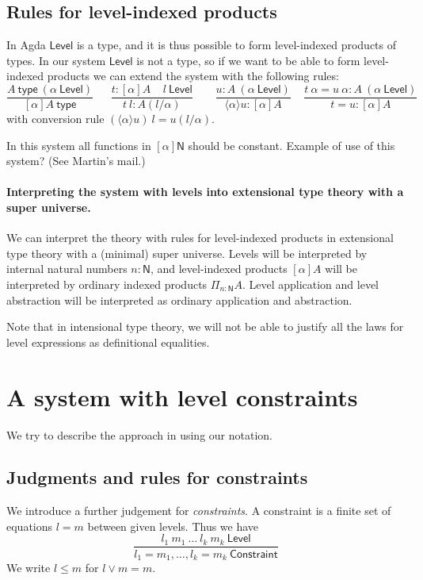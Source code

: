 \documentclass[11pt,a4paper]{article}
\newcommand{\lam}[2]{{\langle}#1{\rangle}#2}
\def\NN{\mathsf{N}}
\def\Level{\mathsf{Level}}
\newcommand{\type}{\mathsf{type}}
\def\Constraint{\mathsf{Constraint}}
\begin{document}
\subsection*{Rules for level-indexed products}

In Agda $\Level$ is a type, and it is thus possible to form level-indexed products of types. In our system $\Level$ is not a type, so if we want to be able to form level-indexed products we can extend the system with the following rules:
$$
\frac{A~\type~(\alpha~\Level)}{[\alpha]A~\type}~~~~~~~
\frac{t:[\alpha]A~~~~~l~\Level}
     {t~l:A(l/\alpha)}~~~~~~~~~
\frac{u:A~(\alpha~\Level)}{\lam{\alpha}{u}: [\alpha]A}~~~~~
\frac{t~\alpha = u~\alpha:A~(\alpha~\Level)}{t = u:[\alpha]A}
$$
with conversion rule $(\lam{\alpha}{u})~l = u(l/\alpha)$.

In this system all functions in $[\alpha]\NN$
should be constant. Example of use of this system? (See Martin's mail.)

\paragraph{Interpreting the system with levels into extensional type theory with a super universe.} We can interpret the theory with rules for level-indexed products in extensional type theory with a (minimal) super universe. Levels will be interpreted by internal natural numbers $n : \NN$, and level-indexed products $[\alpha]A$ will be interpreted by ordinary indexed products $\Pi_{n : \NN}A$. Level application and level abstraction will be interpreted as ordinary application and abstraction.

Note that in intensional type theory, we will not be able to justify all the laws for level expressions as definitional equalities.

\section{A system with level constraints}\label{constraints}

We try to describe the approach in \cite{VV} using our notation.

\subsection{Judgments and rules for constraints}

We introduce a further judgement for {\em constraints}. A constraint is
a finite set of equations $l = m$ between given levels. Thus we have
$$
\frac{l_1~m_1~\dots~l_k~m_k~\Level}{l_1 = m_1,\dots,l_k = m_k~\Constraint}
$$
We write $l\leqslant m$ for $l\vee m = m$.
\end{document}
